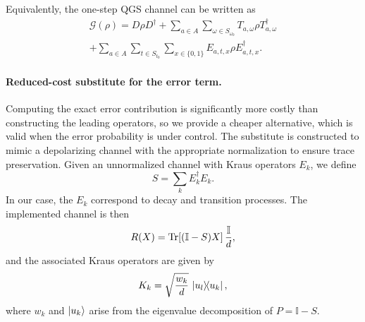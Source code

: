 \documentclass[showpacs,amsmath,amssymb,twocolumn,prx,superscriptaddress,10pt,aps,nofootinbib]{revtex4-2}
\DeclarePairedDelimiter\ket{|}{\rangle}
\newcommand{\bbI}{\mathbb{I}}
\begin{document}
Equivalently, the one-step QGS channel can be written as
\begin{equation}
\begin{split}
    \mathcal{G}(\rho)
    =
    D \rho D^{\dagger}
    + \sum_{a\in A} \sum_{\omega\in S_{\omega_0}}
      T_{a,\omega} \rho T_{a,\omega}^{\dagger} \\
    + \sum_{a\in A} \sum_{t\in S_{t_0}} \sum_{x\in\{0,1\}}
      E_{a,t,x} \rho E_{a,t,x}^{\dagger}.
\end{split}
\end{equation}

\paragraph{Reduced-cost substitute for the error term.}

Computing the exact error contribution is significantly more costly than constructing the leading operators, so we provide a cheaper alternative, which is valid when the error probability is under control. The substitute is constructed to mimic a depolarizing channel with the appropriate normalization to ensure trace preservation. Given an unnormalized channel with Kraus operators $E_k$, we define
\begin{equation}
S = \sum_k E_k^\dagger E_k.
\end{equation}
In our case, the $E_k$ correspond to decay and transition processes. The implemented channel is then
\begin{equation}
R(X) = \Tr[(\bbI - S) X] \, \frac{\bbI}{d},
\end{equation}
and the associated Kraus operators are given by
\begin{equation}
K_k = \sqrt{\frac{w_k}{d}} \, \ketbra{u_l}{u_k},
\end{equation}
where $w_k$ and $\ket{u_k}$ arise from the eigenvalue decomposition of $P = \bbI - S$.


\end{document}
